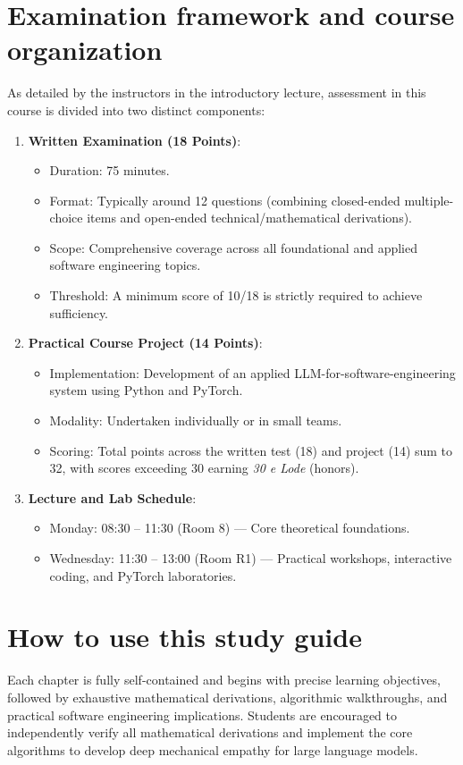 \documentclass[../main.tex]{subfiles}
\begin{document}
\section*{Examination framework and course organization}
As detailed by the instructors in the introductory lecture, assessment in this course is divided into two distinct components:
\begin{enumerate}
    \item \textbf{Written Examination (18 Points)}:
    \begin{itemize}
        \item Duration: 75 minutes.
        \item Format: Typically around 12 questions (combining closed-ended multiple-choice items and open-ended technical/mathematical derivations).
        \item Scope: Comprehensive coverage across all foundational and applied software engineering topics.
        \item Threshold: A minimum score of 10/18 is strictly required to achieve sufficiency.
    \end{itemize}
    \item \textbf{Practical Course Project (14 Points)}:
    \begin{itemize}
        \item Implementation: Development of an applied LLM-for-software-engineering system using Python and PyTorch.
        \item Modality: Undertaken individually or in small teams.
        \item Scoring: Total points across the written test (18) and project (14) sum to 32, with scores exceeding 30 earning \emph{30 e Lode} (honors).
    \end{itemize}
    \item \textbf{Lecture and Lab Schedule}:
    \begin{itemize}
        \item Monday: 08:30 -- 11:30 (Room 8) --- Core theoretical foundations.
        \item Wednesday: 11:30 -- 13:00 (Room R1) --- Practical workshops, interactive coding, and PyTorch laboratories.
    \end{itemize}
\end{enumerate}

\section*{How to use this study guide}
Each chapter is fully self-contained and begins with precise learning objectives, followed by exhaustive mathematical derivations, algorithmic walkthroughs, and practical software engineering implications. Students are encouraged to independently verify all mathematical derivations and implement the core algorithms to develop deep mechanical empathy for large language models.
\end{document}
